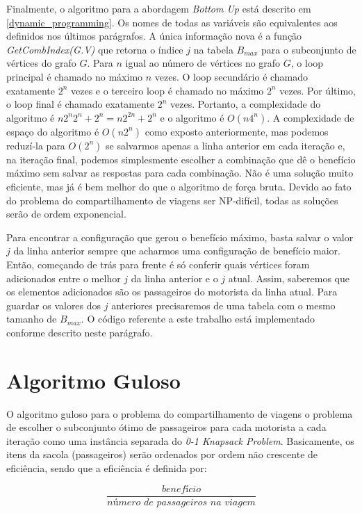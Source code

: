 \documentclass{article}
\begin{document}
Finalmente, o algoritmo para a abordagem \textit{Bottom Up} está descrito em \ref{dynamic_programming}. Os
nomes de todas as variáveis são equivalentes aos definidos nos últimos parágrafos. A única informação nova é a 
função \textit{GetCombIndex(G.V)} que retorna o índice $ j $ na tabela $ B_{max} $ para o subconjunto de vértices do grafo $ G $.
Para $ n $ igual ao número de vértices no grafo $ G $, o loop principal é chamado no máximo $ n $ vezes. O loop secundário é chamado 
exatamente $ 2^n $ vezes e o terceiro loop é chamado no máximo $ 2^n $ vezes. Por último, o loop final é chamado exatamente $ 2^n $
vezes. Portanto, a complexidade do algoritmo é $ n2^n2^n + 2^n = n2^{2n} + 2^n $ e o algoritmo é $ O(n4^n) $. A complexidade de espaço
do algoritmo é $ O(n2^n) $ como exposto anteriormente, mas podemos reduzí-la para $ O(2^n) $ se salvarmos apenas a linha anterior
em cada iteração e, na iteração final, podemos simplesmente escolher a combinação que dê o benefício máximo sem salvar
as respostas para cada combinação. Não é uma solução muito eficiente, mas já é bem melhor do que o algoritmo de força bruta. Devido 
ao fato do problema do compartilhamento de viagens ser NP-difícil, todas as soluções serão de ordem exponencial.

Para encontrar a configuração que gerou o benefício máximo, basta salvar o valor $ j $ da linha anterior
sempre que acharmos uma configuração de benefício maior. Então, começando de trás para frente é só conferir quais vértices
foram adicionados entre o melhor $ j $ da linha anterior e o $ j $ atual. Assim, saberemos que os elementos adicionados
são os passageiros do motorista da linha atual. Para guardar os valores dos $ j $ anteriores precisaremos de uma tabela
com o mesmo tamanho de $ B_{max} $. O código referente a este trabalho está implementado conforme descrito neste parágrafo.

\section{Algoritmo Guloso}

O algoritmo guloso para o problema do compartilhamento de viagens o problema de escolher o subconjunto ótimo de passageiros para
cada motorista a cada iteração como uma instância separada do \textit{0-1 Knapsack Problem}. Basicamente, os itens da sacola (passageiros) 
serão ordenados por ordem não crescente de eficiência, sendo que a eficiência é definida por:

\[ 
\frac{\textit{benefício}}{\textit{número de passageiros na viagem}}
\]
\end{document}
